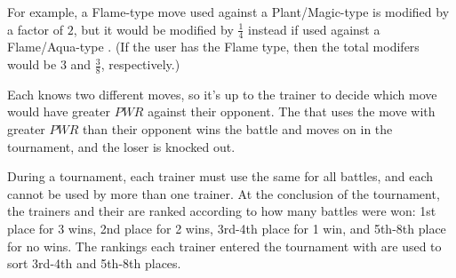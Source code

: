 For example, a Flame-type move used against a Plant/Magic-type
\mappMobimon{} is modified by a factor of \(2\), but it
would be modified by \(\frac{1}{4}\) instead if used against a Flame/Aqua-type
\mappMobimon{}. (If the user has the Flame type, then the total modifers would
be \(3\) and \(\frac{3}{8}\), respectively.)

Each \mappMobimon{} knows two different moves, so it's up to the
trainer to decide which move would have greater \(PWR\) against their
opponent. The \mappMobimon{} that uses the move with greater \(PWR\) than
their opponent wins the battle and moves on in the tournament, and the
loser is knocked out.

During a tournament, each trainer must use the same \mappMobimon{} for all
battles, and each \mappMobimon{} cannot be used by more than one trainer.
At the conclusion of the tournament, the trainers and their
\mappMobimon{} are ranked according
to how many battles were won: 1st place for 3 wins, 2nd place for 2 wins,
3rd-4th place for 1 win, and 5th-8th place for no wins. The rankings each
trainer entered the tournament with are used to sort 3rd-4th and 5th-8th
places.


